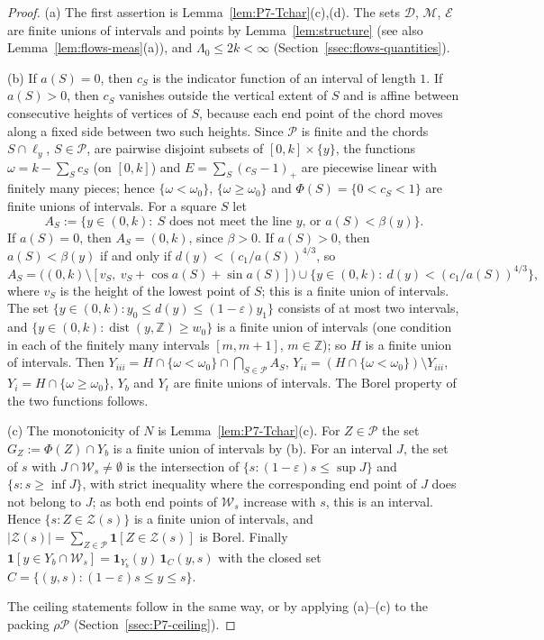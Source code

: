 \documentclass[11pt]{amsart}
\newcommand{\Z}{\mathbb Z}
\newcommand{\eps}{\varepsilon}
\newcommand{\cP}{\mathcal P}
\newcommand{\cD}{\mathcal D}
\newcommand{\cM}{\mathcal M}
\newcommand{\cE}{\mathcal E}
\newcommand{\cZ}{\mathcal Z}
\newcommand{\dist}{\operatorname{dist}}
\theoremstyle{definition}
\theoremstyle{remark}
\numberwithin{equation}{section}
\begin{document}
\begin{proof}
(a) The first assertion is Lemma~\ref{lem:P7-Tchar}(c),(d). The sets $\cD$, $\cM$, $\cE$ are finite unions of intervals and points by Lemma~\ref{lem:structure} (see also Lemma~\ref{lem:flows-meas}(a)), and $\Lambda_0\le2k<\infty$ (Section~\ref{ssec:flows-quantities}).

(b) If $a(S)=0$, then $c_S$ is the indicator function of an interval of length $1$. If $a(S)>0$, then $c_S$ vanishes outside the vertical extent of $S$ and is affine between consecutive heights of vertices of $S$, because each end point of the chord moves along a fixed side between two such heights. Since $\cP$ is finite and the chords $S\cap\ell_y$, $S\in\cP$, are pairwise disjoint subsets of $[0,k]\times\{y\}$, the functions $\omega=k-\sum_Sc_S$ (on $[0,k]$) and $E=\sum_S(c_S-1)_+$ are piecewise linear with finitely many pieces; hence $\{\omega<\omega_0\}$, $\{\omega\ge\omega_0\}$ and $\Phi(S)=\{0<c_S<1\}$ are finite unions of intervals. For a square $S$ let
\[
A_S:=\{y\in(0,k):\ \text{$S$ does not meet the line $y$, or }a(S)<\beta(y)\}.
\]
If $a(S)=0$, then $A_S=(0,k)$, since $\beta>0$. If $a(S)>0$, then $a(S)<\beta(y)$ if and only if $d(y)<(c_1/a(S))^{4/3}$, so
\[
A_S=\big((0,k)\setminus[v_S,\ v_S+\cos a(S)+\sin a(S)]\big)\cup\big\{y\in(0,k):\ d(y)<(c_1/a(S))^{4/3}\big\},
\]
where $v_S$ is the height of the lowest point of $S$; this is a finite union of intervals. The set $\{y\in(0,k):y_0\le d(y)\le(1-\eps)y_1\}$ consists of at most two intervals, and $\{y\in(0,k):\dist(y,\Z)\ge w_0\}$ is a finite union of intervals (one condition in each of the finitely many intervals $[m,m+1]$, $m\in\Z$); so $H$ is a finite union of intervals. Then $Y_{iii}=H\cap\{\omega<\omega_0\}\cap\bigcap_{S\in\cP}A_S$, $Y_{ii}=(H\cap\{\omega<\omega_0\})\setminus Y_{iii}$, $Y_i=H\cap\{\omega\ge\omega_0\}$, $Y_b$ and $Y_t$ are finite unions of intervals. The Borel property of the two functions follows.

(c) The monotonicity of $N$ is Lemma~\ref{lem:P7-Tchar}(c). For $Z\in\cP$ the set $G_Z:=\Phi(Z)\cap Y_b$ is a finite union of intervals by (b). For an interval $J$, the set of $s$ with $J\cap\mathcal W_s\ne\emptyset$ is the intersection of $\{s:(1-\eps)s\le\sup J\}$ and $\{s:s\ge\inf J\}$, with strict inequality where the corresponding end point of $J$ does not belong to $J$; as both end points of $\mathcal W_s$ increase with $s$, this is an interval. Hence $\{s:Z\in\cZ(s)\}$ is a finite union of intervals, and $|\cZ(s)|=\sum_{Z\in\cP}\mathbf 1[Z\in\cZ(s)]$ is Borel. Finally $\mathbf 1[y\in Y_b\cap\mathcal W_s]=\mathbf 1_{Y_b}(y)\,\mathbf 1_C(y,s)$ with the closed set $C=\{(y,s):(1-\eps)s\le y\le s\}$.

The ceiling statements follow in the same way, or by applying (a)--(c) to the packing $\rho\cP$ (Section~\ref{ssec:P7-ceiling}).
\end{proof}
\end{document}

